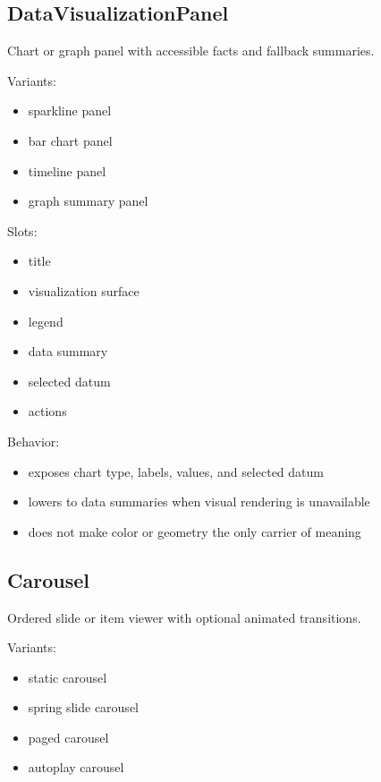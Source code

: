 \subsection{DataVisualizationPanel}\label{record-128-datavisualizationpanel}

Chart or graph panel with accessible facts and fallback summaries.

Variants:

\begin{itemize}
\tightlist
\item
  sparkline panel
\item
  bar chart panel
\item
  timeline panel
\item
  graph summary panel
\end{itemize}

Slots:

\begin{itemize}
\tightlist
\item
  title
\item
  visualization surface
\item
  legend
\item
  data summary
\item
  selected datum
\item
  actions
\end{itemize}

Behavior:

\begin{itemize}
\tightlist
\item
  exposes chart type, labels, values, and selected datum
\item
  lowers to data summaries when visual rendering is unavailable
\item
  does not make color or geometry the only carrier of meaning
\end{itemize}

\subsection{Carousel}\label{record-128-carousel}

Ordered slide or item viewer with optional animated transitions.

Variants:

\begin{itemize}
\tightlist
\item
  static carousel
\item
  spring slide carousel
\item
  paged carousel
\item
  autoplay carousel
\end{itemize}

